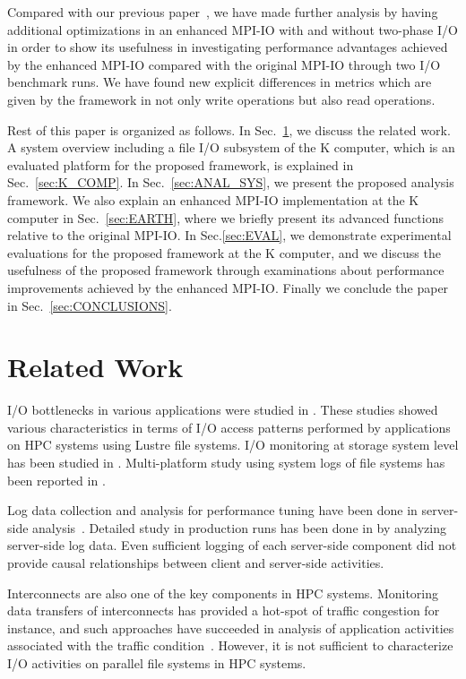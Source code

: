 \documentclass{jhps}
\begin{document}
Compared with our previous paper~\cite{tsujita:hpc_iodc20},
we have made further analysis by having additional
optimizations in an enhanced MPI-IO with and without two-phase I/O
in order to show its usefulness
in investigating performance advantages achieved by
the enhanced MPI-IO compared with the original MPI-IO
through two I/O benchmark runs.
We have found new explicit differences in metrics which are given by the framework
in not only write operations but also read operations.

Rest of this paper is organized as follows.
In Sec.~\ref{sec:RELATED_WORK}, we discuss the related work.
A system overview including a file I/O subsystem of the K computer,
which is an evaluated platform for the proposed framework,
is explained in Sec.~\ref{sec:K_COMP}.
In Sec.~\ref{sec:ANAL_SYS}, we present the proposed analysis framework.
We also explain an enhanced MPI-IO implementation at the K computer
in Sec.~\ref{sec:EARTH}, where we briefly present its advanced functions
relative to the original MPI-IO.
In Sec.\ref{sec:EVAL}, we demonstrate experimental evaluations
for the proposed framework at the K computer, and we discuss the usefulness
of the proposed framework through examinations about performance improvements
achieved by the enhanced MPI-IO.
Finally we conclude the paper in Sec.~\ref{sec:CONCLUSIONS}.

\section{Related Work}
\label{sec:RELATED_WORK}

I/O bottlenecks in various applications were studied in \cite{xie:sc12,saini:hipc12}.
These studies showed various characteristics in terms of I/O access patterns performed
by applications on HPC systems using Lustre file systems.
I/O monitoring at storage system level has been studied
in \cite{isc14:kunkel,uselton:cug13,madireddy:nas17}.
Multi-platform study using system logs of file systems has been reported
in \cite{luu:HPDC2015}.

Log data collection and analysis for performance tuning have been done in
server-side analysis~\cite{liu:fast2014,liu:sc16,xu:cug16}.
Detailed study in production runs has been done in \cite{patel:sc19}
by analyzing server-side log data.
Even sufficient logging of each server-side component did not provide causal relationships
between client and server-side activities.

Interconnects are also one of the key components in HPC systems. Monitoring data transfers of
interconnects has provided a hot-spot of traffic congestion for instance,
and such approaches have succeeded in analysis of application activities associated with
the traffic condition~\cite{zimmer:cug16,kumar:DSN2018}.
However, it is not sufficient to characterize I/O activities on parallel file systems
in HPC systems.
\end{document}
